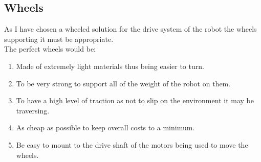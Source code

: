 \subsection{Wheels}
As I have chosen a wheeled solution for the drive system of the robot the wheels supporting it must be appropriate.
\\The perfect wheels would be:
\begin{enumerate}
\item Made of extremely light materials thus being easier to turn.
\item To be very strong to support all of the weight of the robot on them.
\item To have a high level of traction as not to slip on the environment it may be traversing.
\item As cheap as possible to keep overall costs to a minimum.
\item Be easy to mount to the drive shaft of the motors being used to move the wheels.
\end{enumerate}
